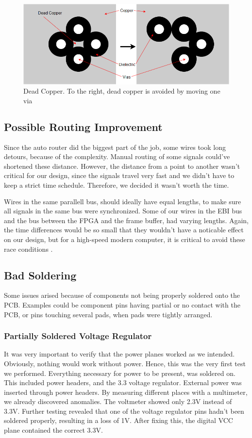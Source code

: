 \begin{figure}[h!]
\centering
\includegraphics[scale = 0.4]{images/Dead_Copper.png}
\caption{Dead Copper. To the right, dead copper is avoided by moving one via}
\label{fig:Dead copper}
\end{figure}

\subsection{Possible Routing Improvement}
Since the auto router did the biggest part of the job, some wires took long detours, because of the complexity. Manual routing of some signals could've shortened these distance. However, the distance from a point to another wasn't critical for our design, since the signals travel very fast and we didn't have to keep a strict time schedule. Therefore, we decided it wasn't worth the time.

Wires in the same parallell bus, should ideally have equal lengths, to make sure all signals in the same bus were synchronized. Some of our wires in the EBI bus and the bus between the FPGA and the frame buffer, had varying lengths. Again, the time differences would be so small that they wouldn't have a noticable effect on our design, but for a high-speed modern computer, it is critical to avoid these race conditions \cite{race-conditions}.

\subsection{Bad Soldering}
Some issues arised because of components not being properly soldered onto the PCB. Examples could be component pins having partial or no contact with the PCB, or pins touching several pads, when pads were tightly arranged.

\subsubsection{Partially Soldered Voltage Regulator} 
It was very important to verify that the power planes worked as we intended. Obviously, nothing would work without power. Hence, this was the very first test we performed.
\newline
Everything necessary for power to be present, was soldered on. This included power headers, and the 3.3 voltage regulator. External power was inserted through power headers. By measuring different places with a multimeter, we already discovered anomalies. The voltmeter showed only 2.3V instead of 3.3V. Further testing revealed that one of the voltage regulator pins hadn't been soldered properly, resulting in a loss of 1V. After fixing this, the digital VCC plane contained the correct 3.3V.

